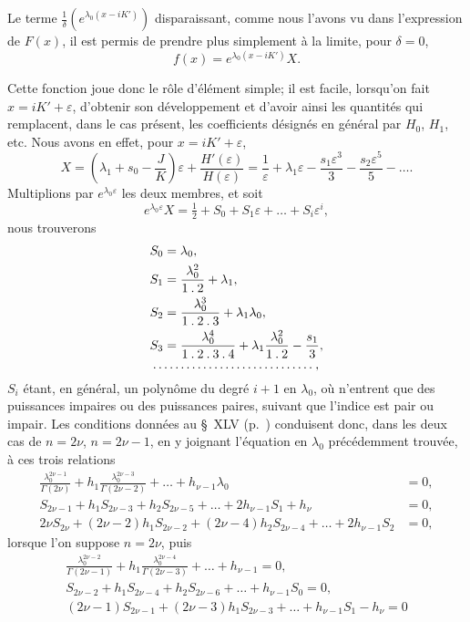 \documentclass[11pt,leqno,oneside,letterpaper]{book}[2005/09/16]
\newcommand{\cntrdot}{\mathbin{.}}
\newcommand{\dotfillalign}{\multispan{2}{\dotfill}}
\begin{document}
Le terme $\frac{1}{\delta}(e^{\lambda_0(x-iK')})$ disparaissant, comme nous l'avons vu dans l'expression
de $F(x)$, il est permis de prendre plus simplement \`a la limite,
pour $\delta = 0$,
\[
f(x) = e^{\lambda_0(x-iK')} X.
\]

Cette fonction joue donc le r\^ole d'\'el\'ement simple; il est facile, lorsqu'on
fait $x = iK'+\varepsilon$, d'obtenir son d\'eveloppement et d'avoir ainsi les
quantit\'es qui remplacent, dans le cas pr\'esent, les coefficients d\'esign\'es en
g\'en\'eral par $H_0$, $H_1$, etc. Nous avons en effet, pour $x = iK'+\varepsilon$,
\[
X = \left( \lambda_1 + s_0 - \frac{J}{K} \right) \varepsilon
  + \frac{H'(\varepsilon)}{H(\varepsilon)} = \frac{1}{\varepsilon}
  + \lambda_1 \varepsilon - \frac{s_1 \varepsilon^3}{3} - \frac{s_2 \varepsilon^5}{5}
  - \ldots.
\]
Multiplions par $e^{\lambda_0 \varepsilon}$ les deux membres, et soit
\[
e^{\lambda_0\varepsilon} X = \tfrac{1}{2} + S_0 + S_1\varepsilon + \ldots + S_i\varepsilon^i,
\]
nous trouverons
\begin{align*}
S_0 &= \lambda_0,    \\
S_1 &= \frac{\lambda^2_0}{1 \cntrdot 2} + \lambda_1,\\
S_2 &= \frac{\lambda^3_0}{1 \cntrdot 2 \cntrdot 3} + \lambda_1 \lambda_0, \\
S_3 &= \frac{\lambda^4_0}{1\cntrdot 2\cntrdot 3\cntrdot 4}
     + \lambda_1\frac{\lambda^2_0}{1 \cntrdot 2} - \frac{s_1}{3},\\
\dotfillalign,
\end{align*}
$S_i$ \'etant, en g\'en\'eral, un polyn\^ome du degr\'e $i + 1$ en $\lambda_0$,
o\`u n'entrent que des puissances impaires ou des puissances paires, suivant
que l'indice est pair ou impair. Les conditions donn\'ees au \S~XLV
(p.~\pageref{page123a}) conduisent donc, dans les deux cas de
$n=2\nu$, $n = 2\nu-1$, en y joignant l'\'equation en $\lambda_0$
pr\'ec\'edemment trouv\'ee, \`a ces trois relations
\begin{align*}
     \frac{\lambda_0^{2\nu-1}}{\Gamma(2\nu  )}
+ h_1\frac{\lambda_0^{2\nu-3}}{\Gamma(2\nu-2)} + \ldots
   + h_{\nu-1} \lambda_0 &= 0, \\
S_{2\nu-1} + h_1 S_{2\nu-3} + h_2 S_{2\nu-5} + \ldots + 2h_{\nu-1}S_1 + h_{\nu} &= 0,\\
2\nu S_{2\nu} + (2\nu-2)h_1 S_{2\nu-2} + (2\nu-4)h_2 S_{2\nu-4} + \ldots
  + 2h_{\nu-1} S_2 &=0,
\end{align*}
lorsque l'on suppose $n=2\nu$, puis
\begin{gather*}
         \frac{\lambda^{2\nu-2}_0}{\Gamma(2\nu-1)}
   + h_1 \frac{\lambda^{2\nu-4}_0}{\Gamma(2\nu-3)} + \ldots + h_{\nu-1} = 0, \\
S_{2\nu-2} + h_1 S_{2\nu-4} + h_2 S_{2\nu-6} + \ldots + h_{\nu-1} S_0 = 0,\\
(2\nu-1)S_{2\nu-1} + (2\nu-3)h_1 S_{2\nu-3} + \ldots + h_{\nu-1} S_1 - h_{\nu} = 0
\end{gather*}
\end{document}
